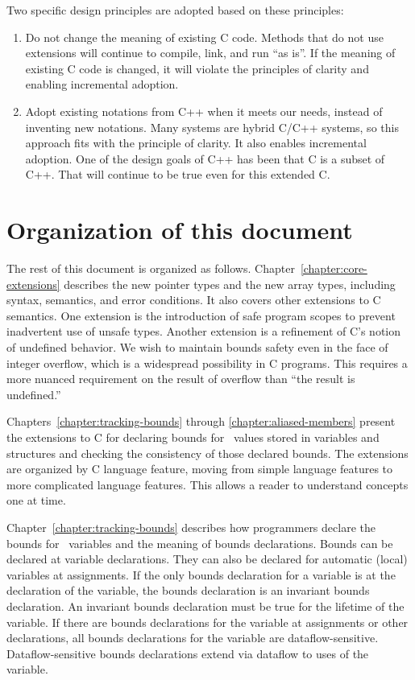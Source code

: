 Two specific design principles are adopted based on these principles:

\begin{enumerate}
\item
  Do not change the meaning of existing C code. Methods that do not use
  extensions will continue to compile, link, and run ``as is''. If the
  meaning of existing C code is changed, it will violate the principles
  of clarity and enabling incremental adoption.
\item
  Adopt existing notations from C++ when it meets our needs, instead of
  inventing new notations. Many systems are hybrid C/C++ systems, so
  this approach fits with the principle of clarity. It also enables
  incremental adoption. One of the design goals of C++ has been that C
  is a subset of C++. That will continue to be true even for this
  extended C.
\end{enumerate}

\section{Organization of this document}

The rest of this document is organized as follows.
Chapter~\ref{chapter:core-extensions} describes
the new pointer types and the new array types, including syntax,
semantics, and error conditions. It also covers other extensions to C
semantics. One extension is the introduction of safe program scopes to
prevent inadvertent use of unsafe types. Another extension is a
refinement of C's notion of undefined behavior. We wish to maintain
bounds safety even in the face of integer overflow, which is a
widespread possibility in C programs. This requires a more nuanced
requirement on the result of overflow than ``the result is undefined.''

Chapters~\ref{chapter:tracking-bounds} through \ref{chapter:aliased-members}
present the extensions to C for declaring bounds
for \arrayptr\ values stored in variables and structures and
checking the consistency of those declared bounds. The extensions are
organized by C language feature, moving from simple language features to
more complicated language features. This allows a reader to understand
concepts one at time.

Chapter~\ref{chapter:tracking-bounds} describes how programmers declare the bounds for
\arrayptr\ variables and the meaning of bounds declarations.
Bounds can be declared at variable declarations. They can also be
declared for automatic (local) variables at assignments. If the only
bounds declaration for a variable is at the declaration of the variable,
the bounds declaration is an invariant bounds declaration. An invariant
bounds declaration must be true for the lifetime of the variable. If
there are bounds declarations for the variable at assignments or other
declarations, all bounds declarations for the variable are
dataflow-sensitive. Dataflow-sensitive bounds declarations extend via
dataflow to uses of the variable.

